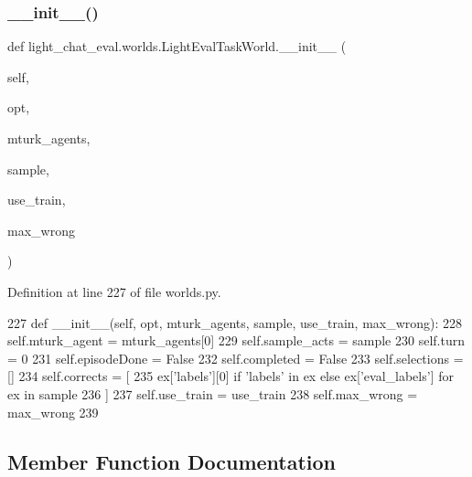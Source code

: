 \subsubsection{\texorpdfstring{\+\_\+\+\_\+init\+\_\+\+\_\+()}{\_\_init\_\_()}}
{\footnotesize\ttfamily def light\+\_\+chat\+\_\+eval.\+worlds.\+Light\+Eval\+Task\+World.\+\_\+\+\_\+init\+\_\+\+\_\+ (\begin{DoxyParamCaption}\item[{}]{self,  }\item[{}]{opt,  }\item[{}]{mturk\+\_\+agents,  }\item[{}]{sample,  }\item[{}]{use\+\_\+train,  }\item[{}]{max\+\_\+wrong }\end{DoxyParamCaption})}



Definition at line 227 of file worlds.\+py.


\begin{DoxyCode}
227     \textcolor{keyword}{def }\_\_init\_\_(self, opt, mturk\_agents, sample, use\_train, max\_wrong):
228         self.mturk\_agent = mturk\_agents[0]
229         self.sample\_acts = sample
230         self.turn = 0
231         self.episodeDone = \textcolor{keyword}{False}
232         self.completed = \textcolor{keyword}{False}
233         self.selections = []
234         self.corrects = [
235             ex[\textcolor{stringliteral}{'labels'}][0] \textcolor{keywordflow}{if} \textcolor{stringliteral}{'labels'} \textcolor{keywordflow}{in} ex \textcolor{keywordflow}{else} ex[\textcolor{stringliteral}{'eval\_labels'}] \textcolor{keywordflow}{for} ex \textcolor{keywordflow}{in} sample
236         ]
237         self.use\_train = use\_train
238         self.max\_wrong = max\_wrong
239 
\end{DoxyCode}


\subsection{Member Function Documentation}
\mbox{\label{classlight__chat__eval_1_1worlds_1_1LightEvalTaskWorld_a950251a737281924e06c7720c2de9dd8}} 

